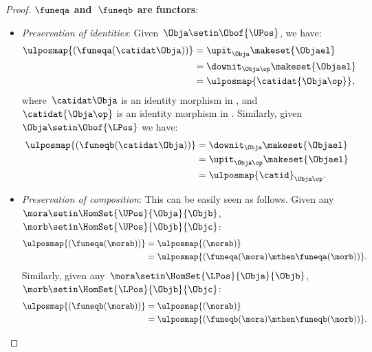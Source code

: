 \begin{proof}
    \textbf{$\funeqa$ and~$\funeqb$ are functors}:
    \begin{itemize}
        \item \emph{Preservation of identities}: Given~$\Obja\setin \Obof{\UPos}$, we have:
              \begin{equation}
                  \begin{aligned}
                      \ulposmap{(\funeqa(\catidat\Obja))} & =\upit_\Obja\makeset{\Objael} \\
                                                          & =\downit_{\Obja\op}\makeset{\Objael} \\
                                                          & =\ulposmap{\catidat{\Obja\op}},
                  \end{aligned}
              \end{equation}
              where~$\catidat\Obja$ is an identity morphism in \UPos, and~$\catidat{\Obja\op}$ is an identity morphism in \LPos.
              Similarly, given~$\Obja\setin \Obof{\LPos}$ we have:
              \begin{equation}
                  \begin{aligned}
                      \ulposmap{(\funeqb(\catidat\Obja))} & =\downit_\Obja\makeset{\Objael} \\
                                                          & =\upit_{\Obja\op}\makeset{\Objael} \\
                                                          & =\ulposmap{\catid}_{\Obja\op}.
                  \end{aligned}
              \end{equation}
        \item \emph{Preservation of composition}: This can be easily seen as follows.
              Given any~$\mora\setin \HomSet{\UPos}{\Obja}{\Objb}$,~$\morb\setin \HomSet{\UPos}{\Objb}{\Objc}$:
              \begin{equation}
                  \begin{aligned}
                      \ulposmap{(\funeqa(\morab))} & =\ulposmap{(\morab)} \\
                                                   & =\ulposmap{(\funeqa(\mora)\mthen \funeqa(\morb))}.
                  \end{aligned}
              \end{equation}
              Similarly, given any~$\mora\setin \HomSet{\LPos}{\Obja}{\Objb}$,~$\morb\setin \HomSet{\LPos}{\Objb}{\Objc}$:
              \begin{equation}
                  \begin{aligned}
                      \ulposmap{(\funeqb(\morab))} & =\ulposmap{(\morab)} \\
                                                   & =\ulposmap{(\funeqb(\mora)\mthen \funeqb(\morb))}.
                  \end{aligned}
              \end{equation}
    \end{itemize}


\end{proof}
